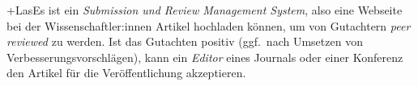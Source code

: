 
+LasEs ist ein \emph{Submission und Review Management System}, also eine Webseite bei der Wissenschaftler:innen Artikel hochladen können, um von Gutachtern \emph{peer reviewed} zu werden.
Ist das Gutachten positiv (ggf.\ nach Umsetzen von Verbesserungsvorschlägen), kann ein \emph{Editor} eines Journals oder einer Konferenz den Artikel für die Veröffentlichung akzeptieren.

